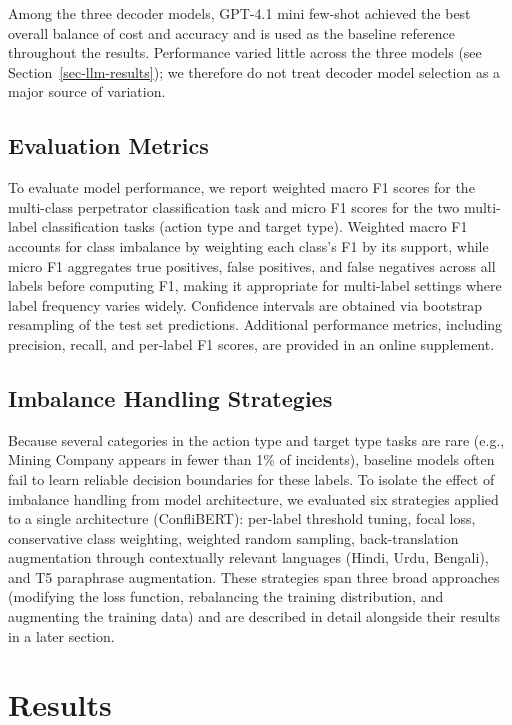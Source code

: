 \documentclass[
  11pt,
]{article}
\begin{document}
Among the three decoder models, GPT-4.1 mini few-shot achieved the best
overall balance of cost and accuracy and is used as the baseline
reference throughout the results. Performance varied little across the
three models (see Section~\ref{sec-llm-results}); we therefore do not
treat decoder model selection as a major source of variation.

\subsection{Evaluation Metrics}\label{evaluation-metrics}

To evaluate model performance, we report weighted macro F1 scores for
the multi-class perpetrator classification task and micro F1 scores for
the two multi-label classification tasks (action type and target type).
Weighted macro F1 accounts for class imbalance by weighting each class's
F1 by its support, while micro F1 aggregates true positives, false
positives, and false negatives across all labels before computing F1,
making it appropriate for multi-label settings where label frequency
varies widely. Confidence intervals are obtained via bootstrap
resampling of the test set predictions. Additional performance metrics,
including precision, recall, and per-label F1 scores, are provided in an
online supplement.

\subsection{Imbalance Handling
Strategies}\label{imbalance-handling-strategies}

Because several categories in the action type and target type tasks are
rare (e.g., Mining Company appears in fewer than 1\% of incidents),
baseline models often fail to learn reliable decision boundaries for
these labels. To isolate the effect of imbalance handling from model
architecture, we evaluated six strategies applied to a single
architecture (ConfliBERT): per-label threshold tuning, focal loss,
conservative class weighting, weighted random sampling, back-translation
augmentation through contextually relevant languages (Hindi, Urdu,
Bengali), and T5 paraphrase augmentation. These strategies span three
broad approaches (modifying the loss function, rebalancing the training
distribution, and augmenting the training data) and are described in
detail alongside their results in a later section.

\section{Results}\label{results}
\end{document}
